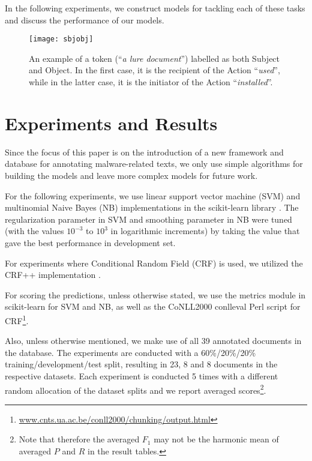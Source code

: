 \documentclass[11pt,a4paper]{article}
\begin{document}
In the following experiments, we construct models for tackling each of these tasks and discuss the performance of our models.

\begin{figure*}[t]
\centering
\texttt{[image: sbjobj]}
\vspace{-2mm}
\caption{\label{subjectobject}
An example of a token (``\emph{a lure document}'') labelled as both Subject and Object. In the first case, it is the recipient of the Action ``\emph{used}'', while in the latter case, it is the initiator of the Action ``\emph{installed}''.
}
\end{figure*}


\section{Experiments and Results}


Since the focus of this paper is on the introduction of a new framework and database for annotating malware-related texts, we only use simple algorithms for building the models and leave more complex models for future work. 

For the following experiments, we use linear support vector machine (SVM) and multinomial Naive Bayes (NB) implementations in the scikit-learn library \cite{scikit-learn}. The regularization parameter in SVM and smoothing parameter in NB were tuned (with the values $10^{-3}$ to $10^{3}$ in logarithmic increments) by taking the value that gave the best performance in development set.

For experiments where Conditional Random Field (CRF) \cite{Lafferty:01} is used, we utilized the CRF++ implementation \cite{Kudo}. 

For scoring the predictions, unless otherwise stated, we use the metrics module in scikit-learn for SVM and NB, as well as the CoNLL2000 conlleval Perl script for CRF\footnote{\url{www.cnts.ua.ac.be/conll2000/chunking/output.html}}.

Also, unless otherwise mentioned, we make use of all 39 annotated documents in the database. The experiments are conducted with a 60\%/20\%/20\% training/development/test split, resulting in 23, 8 and 8 documents in the respective datasets. Each experiment is conducted 5 times with a different random allocation of the dataset splits and we report averaged scores\footnote{Note that therefore the averaged $F_1$ may not be the harmonic mean of averaged $P$ and $R$ in the result tables.}. 
\end{document}
